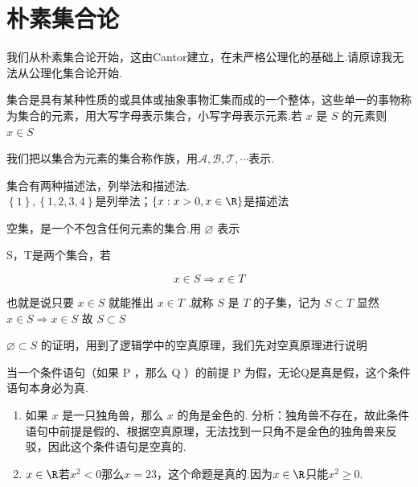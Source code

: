 \section{朴素集合论}
我们从朴素集合论开始，这由Cantor建立，在未严格公理化的基础上.请原谅我无法从公理化集合论开始.

\begin{definition}
	集合是具有某种性质的或具体或抽象事物汇集而成的一个整体，这些单一的事物称为集合的元素，用大写字母表示集合，小写字母表示元素.若 $x$ 是 $S$ 的元素则 $x \in S$
	
	我们把以集合为元素的集合称作族，用$\mathcal{A},\mathcal{B},\mathcal{T},\cdots$表示.
\end{definition}

\begin{example}
	集合有两种描述法，列举法和描述法.\\
	$\left\{1\right\},\left\{1,2,3,4\right\}$是列举法；$\left\{x:x>0,x\in\R\right\}$是描述法
\end{example}
\begin{definition}
	空集，是一个不包含任何元素的集合.用 $\varnothing$ 表示
	
\end{definition}
\begin{definition}
	S，T是两个集合，若
	
	\[x \in S \Rightarrow x \in T
	\]
	
	
	也就是说只要 $x \in S$ 就能推出 $x \in T$ .就称 $S$ 是 $T$ 的子集，记为 $S \subset T$
	显然 $x \in S \Rightarrow x \in S$ 故 $S \subset S$
	
\end{definition}
$\varnothing \subset S$ 的证明，用到了逻辑学中的空真原理，我们先对空真原理进行说明
\begin{prp}
	当一个条件语句（如果 P ，那么 Q ）的前提 P 为假，无论Q是真是假，这个条件语句本身必为真.
	

\end{prp}

	\begin{example}
		\begin{enumerate}
			\item 如果 $x$ 是一只独角兽，那么 $x$ 的角是金色的.
			分析：独角兽不存在，故此条件语句中前提是假的、根据空真原理，无法找到一只角不是金色的独角兽来反驳，因此这个条件语句是空真的.
			\item $x\in\R$若$x^2<0$那么$x=23$，这个命题是真的.因为$x\in\R$只能$x^2\geqslant0$.
		\end{enumerate}
\end{example}

